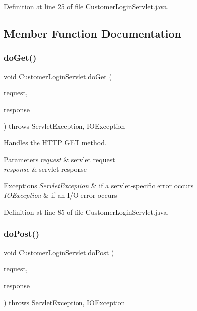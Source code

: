 Definition at line 25 of file Customer\+Login\+Servlet.\+java.



\subsection{Member Function Documentation}
\mbox{\label{class_customer_login_servlet_ae6d67d2b4148532307f544248e8075d3}} 
\subsubsection{\texorpdfstring{doGet()}{doGet()}}
{\footnotesize\ttfamily void Customer\+Login\+Servlet.\+do\+Get (\begin{DoxyParamCaption}\item[{Http\+Servlet\+Request}]{request,  }\item[{Http\+Servlet\+Response}]{response }\end{DoxyParamCaption}) throws Servlet\+Exception, I\+O\+Exception\hspace{0.3cm}{\ttfamily [protected]}}

Handles the H\+T\+TP {\ttfamily G\+ET} method.


\begin{DoxyParams}{Parameters}
{\em request} & servlet request \\
\hline
{\em response} & servlet response \\
\hline
\end{DoxyParams}

\begin{DoxyExceptions}{Exceptions}
{\em Servlet\+Exception} & if a servlet-\/specific error occurs \\
\hline
{\em I\+O\+Exception} & if an I/O error occurs \\
\hline
\end{DoxyExceptions}


Definition at line 85 of file Customer\+Login\+Servlet.\+java.

\mbox{\label{class_customer_login_servlet_ae51d29b131844b7c997754bf3effd262}} 
\subsubsection{\texorpdfstring{doPost()}{doPost()}}
{\footnotesize\ttfamily void Customer\+Login\+Servlet.\+do\+Post (\begin{DoxyParamCaption}\item[{Http\+Servlet\+Request}]{request,  }\item[{Http\+Servlet\+Response}]{response }\end{DoxyParamCaption}) throws Servlet\+Exception, I\+O\+Exception\hspace{0.3cm}{\ttfamily [protected]}}

